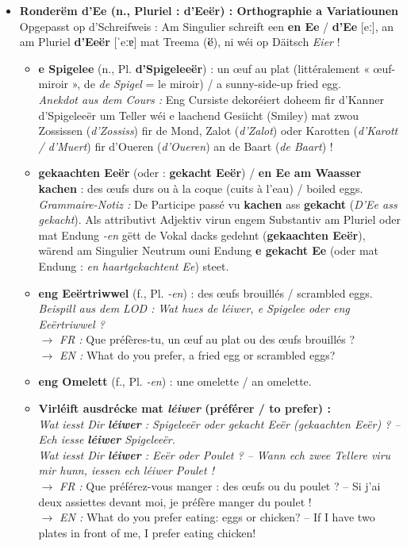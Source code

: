 \begin{itemize}
    \item \textbf{Ronderëm d'Ee (n., Pluriel : d'Eeër) : Orthographie a Variatiounen} \\
    Opgepasst op d'Schreifweis : Am Singulier schreift een \textbf{en Ee} / \textbf{d'Ee} [eː], an am Pluriel \textbf{d'Eeër} [ˈeːɐ] mat Treema (\textbf{ë}), ni wéi op Däitsch \textit{\flqq *Eier\frqq} !
    \begin{itemize}
        \item \textbf{e Spigelee} (n., Pl. \textbf{d'Spigeleeër}) : un œuf au plat (littéralement « œuf-miroir », de \textit{de Spigel} = le miroir) / a sunny-side-up fried egg. \\
        \textit{Anekdot aus dem Cours :} Eng Cursiste dekoréiert doheem fir d'Kanner d'Spigeleeër um Teller wéi e laachend Gesiicht (Smiley) mat zwou Zossissen (\textit{d'Zossiss}) fir de Mond, Zalot (\textit{d'Zalot}) oder Karotten (\textit{d'Karott / d'Muert}) fir d'Oueren (\textit{d'Oueren}) an de Baart (\textit{de Baart}) !
        \item \textbf{gekaachten Eeër} (oder : \textbf{gekacht Eeër}) / \textbf{en Ee am Waasser kachen} : des œufs durs ou à la coque (cuits à l'eau) / boiled eggs. \\
        \textit{Grammaire-Notiz :} De Participe passé vu \textbf{kachen} ass \textbf{gekacht} (\textit{D'Ee ass gekacht}). Als attributivt Adjektiv virun engem Substantiv am Pluriel oder mat Endung \textit{-en} gëtt de Vokal dacks gedehnt (\textbf{gekaachten Eeër}), wärend am Singulier Neutrum ouni Endung \textbf{e gekacht Ee} (oder mat Endung : \textit{en haartgekachtent Ee}) steet.
        \item \textbf{eng Eeërtriwwel} (f., Pl. \textit{-en}) : des œufs brouillés / scrambled eggs. \\
        \textit{Beispill aus dem LOD :} \textit{Wat hues de léiwer, e Spigelee oder eng Eeërtriwwel ?} \\
        $\rightarrow$ \textit{FR :} Que préfères-tu, un œuf au plat ou des œufs brouillés ? \\
        $\rightarrow$ \textit{EN :} What do you prefer, a fried egg or scrambled eggs?
        \item \textbf{eng Omelett} (f., Pl. \textit{-en}) : une omelette / an omelette.
        \item \textbf{Virléift ausdrécke mat \textit{léiwer} (préférer / to prefer) :} \\
        \textit{Wat iesst Dir \textbf{léiwer} : Spigeleeër oder gekacht Eeër (gekaachten Eeër) ? -- Ech iesse \textbf{léiwer} Spigeleeër.} \\
        \textit{Wat iesst Dir \textbf{léiwer} : Eeër oder Poulet ? -- Wann ech zwee Tellere viru mir hunn, iessen ech léiwer Poulet !} \\
        $\rightarrow$ \textit{FR :} Que préférez-vous manger : des œufs ou du poulet ? -- Si j'ai deux assiettes devant moi, je préfère manger du poulet ! \\
        $\rightarrow$ \textit{EN :} What do you prefer eating: eggs or chicken? -- If I have two plates in front of me, I prefer eating chicken!
    \end{itemize}


\end{itemize}
